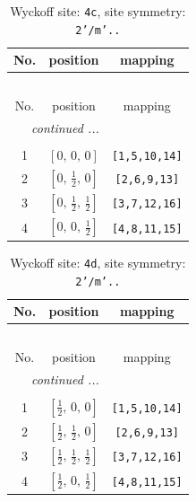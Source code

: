 \documentclass[fleqn,8pt]{jsarticle}
\begin{document}
\renewcommand{\arraystretch}{1.2}
\begin{longtable}{ccc}
\caption{Wyckoff site: {\tt 4c}, site symmetry: {\tt 2'/m'..}}
 \\
 \hline \hline
No. & position & mapping \\ \hline \endfirsthead

\multicolumn{2}{l}{\tablename\ \thetable{}} \\
 \hline \hline
No. & position & mapping \\ \hline \endhead

 \hline \hline
\multicolumn{2}{r}{\footnotesize\it continued ...} \\ \endfoot

 \hline \hline
\multicolumn{2}{r}{} \\ \endlastfoot

1 & $\left[ 0,\, 0,\, 0 \right]$ & {\tt [1,5,10,14]} \\ \hline
2 & $\left[ 0,\, \frac{1}{2},\, 0 \right]$ & {\tt [2,6,9,13]} \\ \hline
3 & $\left[ 0,\, \frac{1}{2},\, \frac{1}{2} \right]$ & {\tt [3,7,12,16]} \\ \hline
4 & $\left[ 0,\, 0,\, \frac{1}{2} \right]$ & {\tt [4,8,11,15]} \\
\end{longtable}
\renewcommand{\arraystretch}{1.2}
\begin{longtable}{ccc}
\caption{Wyckoff site: {\tt 4d}, site symmetry: {\tt 2'/m'..}}
 \\
 \hline \hline
No. & position & mapping \\ \hline \endfirsthead

\multicolumn{2}{l}{\tablename\ \thetable{}} \\
 \hline \hline
No. & position & mapping \\ \hline \endhead

 \hline \hline
\multicolumn{2}{r}{\footnotesize\it continued ...} \\ \endfoot

 \hline \hline
\multicolumn{2}{r}{} \\ \endlastfoot

1 & $\left[ \frac{1}{2},\, 0,\, 0 \right]$ & {\tt [1,5,10,14]} \\ \hline
2 & $\left[ \frac{1}{2},\, \frac{1}{2},\, 0 \right]$ & {\tt [2,6,9,13]} \\ \hline
3 & $\left[ \frac{1}{2},\, \frac{1}{2},\, \frac{1}{2} \right]$ & {\tt [3,7,12,16]} \\ \hline
4 & $\left[ \frac{1}{2},\, 0,\, \frac{1}{2} \right]$ & {\tt [4,8,11,15]} \\
\end{longtable}
\end{document}
